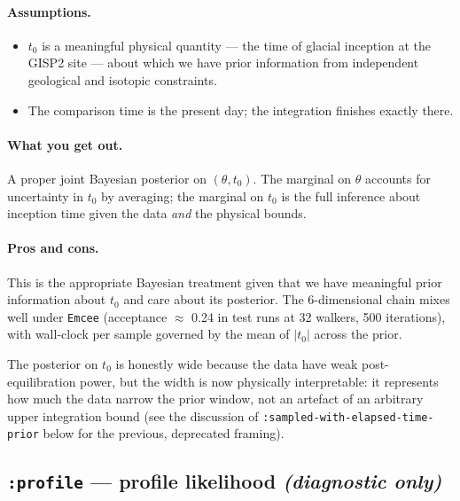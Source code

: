 \documentclass[11pt,a4paper]{article}
\newcommand{\tzero}{\ensuremath{t_{0}}}
\newcommand{\code}[1]{\texttt{#1}}
\begin{document}
\paragraph{Assumptions.}
\begin{itemize}
  \item \tzero{} is a meaningful physical quantity --- the time of glacial
        inception at the GISP2 site --- about which we have prior
        information from independent geological and isotopic constraints.
  \item The comparison time is the present day; the integration finishes
        exactly there.
\end{itemize}

\paragraph{What you get out.}
A proper joint Bayesian posterior on $(\theta, \tzero)$. The marginal on
$\theta$ accounts for uncertainty in \tzero{} by averaging; the marginal on
\tzero{} is the full inference about inception time given the data
\emph{and} the physical bounds.

\paragraph{Pros and cons.}
This is the appropriate Bayesian treatment given that we have meaningful
prior information about \tzero{} and care about its posterior. The
6-dimensional chain mixes well under \code{Emcee} (acceptance $\approx$
0.24 in test runs at 32 walkers, 500 iterations), with wall-clock per
sample governed by the mean of $|\tzero|$ across the prior.

The posterior on \tzero{} is honestly wide because the data have weak
post-equilibration power, but the width is now physically interpretable:
it represents how much the data narrow the prior window, not an artefact
of an arbitrary upper integration bound (see the discussion of
\code{:sampled-with-elapsed-time-prior} below for the previous, deprecated
framing).

\subsection{\code{:profile} --- profile likelihood \emph{(diagnostic only)}}
\end{document}
